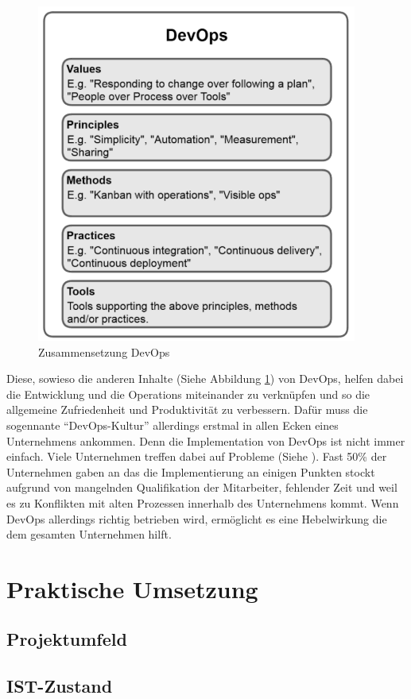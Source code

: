 \begin{figure}[h!]
	\centering
	\includegraphics[scale = 0.7]{img/DEVOPS.png}
	\caption{Zusammensetzung DevOps}
	\label{img:devops}
\end{figure}Diese, sowieso die anderen Inhalte (Siehe Abbildung \ref{img:devops}) von DevOps, helfen dabei die Entwicklung und die Operations miteinander zu verknüpfen und so die allgemeine Zufriedenheit und Produktivität zu verbessern. Dafür muss die sogennante \enquote{DevOps-Kultur} allerdings erstmal in allen Ecken eines Unternehmens ankommen.\autocite[Vgl.][S.23]{Stahl.2018} Denn die Implementation von DevOps ist nicht immer einfach. Viele Unternehmen treffen dabei auf Probleme (Siehe \cite{Claranet.2016}). Fast 50\% der Unternehmen gaben an das die Implementierung an einigen Punkten stockt aufgrund von mangelnden Qualifikation der Mitarbeiter, fehlender Zeit und weil es zu Konflikten mit alten Prozessen innerhalb des Unternehmens kommt.\autocite[Vgl.][]{Claranet.2016} Wenn DevOps allerdings richtig betrieben wird, ermöglicht es eine Hebelwirkung die dem gesamten Unternehmen hilft.\autocite[Vgl.][S.24]{Stahl.2018} 
\chapter{Praktische Umsetzung}
\section{Projektumfeld}
\section{IST-Zustand}
